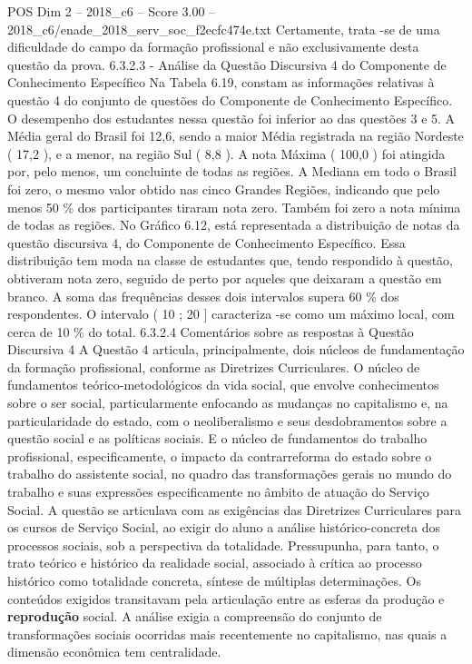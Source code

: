\begin{textsample}{POS Dim 2 – 2018\_c6 – Score 3.00 – 2018\_c6/enade\_2018\_serv\_soc\_f2ecfc474e.txt}
Certamente, trata -se de uma dificuldade do campo da formação profissional e não exclusivamente desta questão da prova. 6.3.2.3 - Análise da Questão Discursiva 4 do Componente de Conhecimento Específico Na Tabela 6.19, constam as informações relativas à questão 4 do conjunto de questões do Componente de Conhecimento Específico.
O desempenho dos estudantes nessa questão foi inferior ao das questões 3 e 5.
A Média geral do Brasil foi 12,6, sendo a maior Média registrada na região Nordeste ( 17,2 ), e a menor, na região Sul ( 8,8 ).
A nota Máxima ( 100,0 ) foi atingida por, pelo menos, um concluinte de todas as regiões.
A Mediana em todo o Brasil foi zero, o mesmo valor obtido nas cinco Grandes Regiões, indicando que pelo menos 50 \% dos participantes tiraram nota zero.
Também foi zero a nota mínima de todas as regiões.
No Gráfico 6.12, está representada a distribuição de notas da questão discursiva 4, do Componente de Conhecimento Específico.
Essa distribuição tem moda na classe de estudantes que, tendo respondido à questão, obtiveram nota zero, seguido de perto por aqueles que deixaram a questão em branco.
A soma das frequências desses dois intervalos supera 60 \% dos respondentes.
O intervalo ( 10 ; 20 ] caracteriza -se como um máximo local, com cerca de 10 \% do total. 6.3.2.4 Comentários sobre as respostas à Questão Discursiva 4 A Questão 4 articula, principalmente, dois núcleos de fundamentação da formação profissional, conforme as Diretrizes Curriculares.
O núcleo de fundamentos teórico-metodológicos da vida social, que envolve conhecimentos sobre o ser social, particularmente enfocando as mudanças no capitalismo e, na particularidade do estado, com o neoliberalismo e seus desdobramentos sobre a questão social e as políticas sociais.
E o núcleo de fundamentos do trabalho profissional, especificamente, o impacto da contrarreforma do estado sobre o trabalho do assistente social, no quadro das transformações gerais no mundo do trabalho e suas expressões especificamente no âmbito de atuação do Serviço Social.
A questão se articulava com as exigências das Diretrizes Curriculares para os cursos de Serviço Social, ao exigir do aluno a análise histórico-concreta dos processos sociais, sob a perspectiva da totalidade.
Pressupunha, para tanto, o trato teórico e histórico da realidade social, associado à crítica ao processo histórico como totalidade concreta, síntese de múltiplas determinações.
Os conteúdos exigidos transitavam pela articulação entre as esferas da produção e \textbf{reprodução} social.
A análise exigia a compreensão do conjunto de transformações sociais ocorridas mais recentemente no capitalismo, nas quais a dimensão econômica tem centralidade.

\end{textsample}
